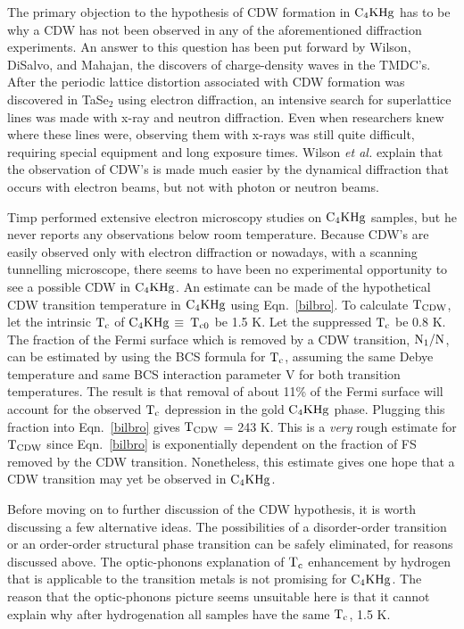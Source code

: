         The primary objection  to the hypothesis of  CDW formation in  $\rm
C_4KHg$  has to    be why a  CDW    has not  been observed  in   any of the
aforementioned diffraction experiments.    An answer  to  this question has
been   put  forward by Wilson,   DiSalvo,  and  Mahajan,   the discovers of
charge-density waves   in  the   TMDC's.\cite{wilson74}  After the periodic
lattice distortion associated with CDW formation was discovered in TaSe$_2$
using electron diffraction, an intensive search  for superlattice lines was
made with x-ray and neutron diffraction.  Even  when researchers knew where
these lines  were, observing them with  x-rays  was still quite  difficult,
requiring special equipment and long  exposure times.\cite{wilson75} Wilson
{\em et al.\/} explain that the observation of CDW's is made much easier by
the  dynamical diffraction that occurs  with electron  beams, but  not with
photon or neutron beams.\cite{wilson75}

        Timp\cite{K167} performed extensive  electron microscopy studies on
$\rm C_4KHg$  samples,  but he  never reports any  observations  below room
temperature.  Because CDW's  are    easily observed  only   with   electron
diffraction\cite{wilson75} or   nowadays,   with   a   scanning  tunnelling
microscope,\cite{coleman85}  there  seems  to have   been   no experimental
opportunity to  see  a possible CDW in  $\rm C_4KHg$.  An estimate can
be made of  the hypothetical  CDW transition temperature   in $\rm  C_4KHg$
using Eqn.~\ref{bilbro}. To calculate $\rm T_{CDW}$, let the intrinsic $\rm
T_c$ of $\rm C_4KHg$ $\equiv \: \rm  T_{c0}$ be 1.5  K.  Let the suppressed
$\rm T_c$ be 0.8 K.  The fraction of the  Fermi surface which is removed by
a CDW transition, $\rm  N_1/N$, can be  estimated by using  the BCS formula
for $\rm T_c$, assuming the same Debye temperature and same BCS interaction
parameter V for both transition temperatures.   The  result is that removal
of about 11\% of the Fermi surface will account for the  observed $\rm T_c$
depression in  the gold $\rm C_4KHg$  phase.  Plugging  this  fraction into
Eqn.~\ref{bilbro} gives $\rm T_{CDW}$ = 243 K.  This is  a {\em very} rough
estimate  for   $\rm   T_{CDW}$ since Eqn.~\ref{bilbro}  is   exponentially
dependent   on   the  fraction  of  FS   removed   by   the CDW transition.
Nonetheless, this estimate gives one hope that a CDW transition may  yet be
observed in $\rm C_4KHg$.

        Before moving on to further discussion of the CDW hypothesis, it is
worth discussing  a  few   alternative ideas.   The    possibilities  of  a
disorder-order transition or an order-order structural phase transition can
be  safely  eliminated, for   reasons  discussed  above.  The optic-phonons
explanation of $\rm T_c$ enhancement by  hydrogen that is applicable to the
transition metals is not promising for $\rm C_4KHg$.  The  reason  that the
optic-phonons picture seems unsuitable here  is  that it cannot explain  why
after hydrogenation all samples have the same $\rm T_c$, 1.5 K.

